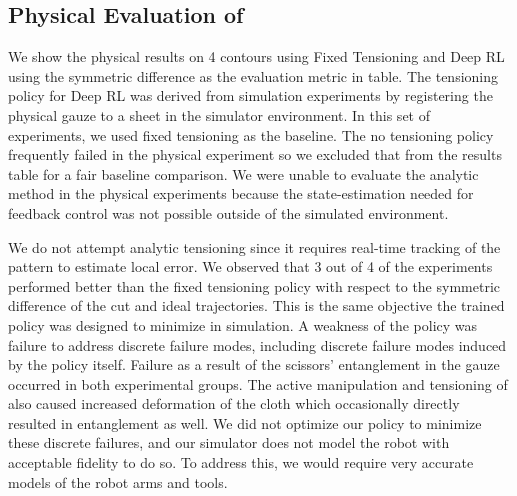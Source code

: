 \subsection*{Physical Evaluation of \tpsalgo} 
We show the physical results on 4 contours using Fixed Tensioning and Deep RL using the symmetric difference as the evaluation metric in table. The tensioning policy for Deep RL was derived from simulation experiments by registering the physical gauze to a sheet in the simulator environment. 
In this set of experiments, we used fixed tensioning as the baseline.
The no tensioning policy frequently failed in the physical experiment so we excluded that from the results table for a fair baseline comparison.
We were unable to evaluate the analytic method in the physical experiments because the state-estimation needed for feedback control was not possible outside of the simulated environment.

 We do not attempt analytic tensioning since it requires real-time tracking of the pattern to estimate local error. We observed that 3 out of 4 of the \tpsalgo experiments performed better than the fixed tensioning policy with respect to the symmetric difference of the cut and ideal trajectories. This is the same objective the trained policy was designed to minimize in simulation. A weakness of the policy was failure to address discrete failure modes, including discrete failure modes induced by the policy itself. Failure as a result of the scissors' entanglement in the gauze occurred in both experimental groups. The active manipulation and tensioning of \tpsalgo also caused increased deformation of the cloth which occasionally directly resulted in entanglement as well. We did not optimize our policy to minimize these discrete failures, and our simulator does not model the robot with acceptable fidelity to do so. To address this, we would require very accurate models of the robot arms and tools.


